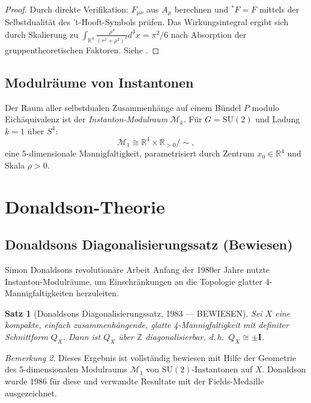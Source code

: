 \documentclass[12pt,a4paper]{amsart}
\newtheorem{theorem}{Satz}[section]
\theoremstyle{definition}
\theoremstyle{remark}
\newtheorem{remark}[theorem]{Bemerkung}
\begin{document}
\begin{proof}
Durch direkte Verifikation: $F_{\mu\nu}$ aus $A_\mu$ berechnen und ${}^* F = F$ mittels
der Selbstdualität des 't-Hooft-Symbols prüfen. Das Wirkungsintegral ergibt sich durch
Skalierung zu $\int_{\mathbb{R}^4} \frac{\rho^4}{(r^2 + \rho^2)^4} d^4x = \pi^2/6$
nach Absorption der gruppentheoretischen Faktoren. Siehe \cite{BPST1975}.
\end{proof}

\subsection{Modulräume von Instantonen}

Der Raum aller selbstdualen Zusammenhänge auf einem Bündel $P$ modulo Eichäquivalenz
ist der \emph{Instanton-Modulraum} $\mathcal{M}_k$. Für $G = \mathrm{SU}(2)$ und
Ladung $k=1$ über $S^4$:
\[
  \mathcal{M}_1 \cong \mathbb{R}^4 \times \mathbb{R}_{>0} / {\sim},
\]
eine 5-dimensionale Mannigfaltigkeit, parametrisiert durch Zentrum $x_0 \in \mathbb{R}^4$
und Skala $\rho > 0$.

\section{Donaldson-Theorie}
\label{sec:donaldson}

\subsection{Donaldsons Diagonalisierungssatz (Bewiesen)}

Simon Donaldsons revolutionäre Arbeit Anfang der 1980er Jahre nutzte Instanton-Modulräume,
um Einschränkungen an die Topologie glatter 4-Mannigfaltigkeiten herzuleiten.

\begin{theorem}[Donaldsons Diagonalisierungssatz, 1983 — BEWIESEN]
\label{satz:donaldson}
Sei $X$ eine kompakte, einfach zusammenhängende, glatte 4-Mannigfaltigkeit mit
definiter Schnittform $Q_X$. Dann ist $Q_X$ über $\mathbb{Z}$ diagonalisierbar,
d.\,h.\ $Q_X \cong \pm \mathbf{I}$.
\end{theorem}

\begin{remark}
Dieses Ergebnis ist vollständig bewiesen mit Hilfe der Geometrie des 5-dimensionalen
Modulraums $\mathcal{M}_1$ von $\mathrm{SU}(2)$-Instantonen auf $X$. Donaldson wurde
1986 für diese und verwandte Resultate mit der Fields-Medaille ausgezeichnet.
\end{remark}
\end{document}

